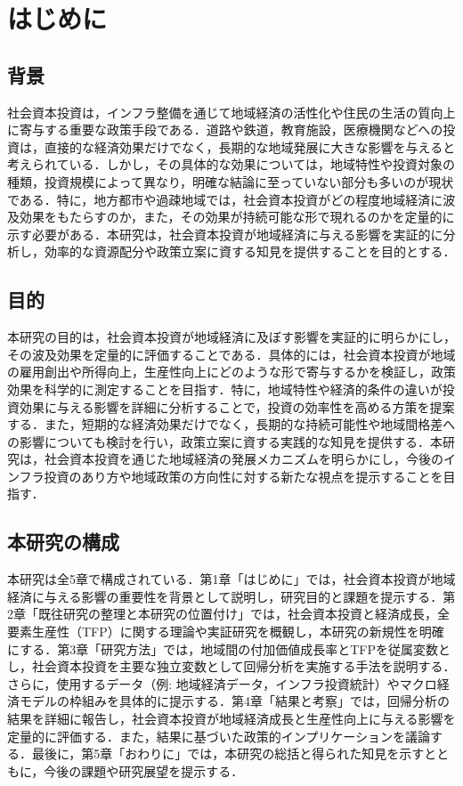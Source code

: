 \chapter{はじめに}

\section{背景}

社会資本投資は，インフラ整備を通じて地域経済の活性化や住民の生活の質向上に寄与する重要な政策手段である．道路や鉄道，教育施設，医療機関などへの投資は，直接的な経済効果だけでなく，長期的な地域発展に大きな影響を与えると考えられている．しかし，その具体的な効果については，地域特性や投資対象の種類，投資規模によって異なり，明確な結論に至っていない部分も多いのが現状である．特に，地方都市や過疎地域では，社会資本投資がどの程度地域経済に波及効果をもたらすのか，また，その効果が持続可能な形で現れるのかを定量的に示す必要がある．本研究は，社会資本投資が地域経済に与える影響を実証的に分析し，効率的な資源配分や政策立案に資する知見を提供することを目的とする．


\section{目的}

本研究の目的は，社会資本投資が地域経済に及ぼす影響を実証的に明らかにし，その波及効果を定量的に評価することである．具体的には，社会資本投資が地域の雇用創出や所得向上，生産性向上にどのような形で寄与するかを検証し，政策効果を科学的に測定することを目指す．特に，地域特性や経済的条件の違いが投資効果に与える影響を詳細に分析することで，投資の効率性を高める方策を提案する．また，短期的な経済効果だけでなく，長期的な持続可能性や地域間格差への影響についても検討を行い，政策立案に資する実践的な知見を提供する．本研究は，社会資本投資を通じた地域経済の発展メカニズムを明らかにし，今後のインフラ投資のあり方や地域政策の方向性に対する新たな視点を提示することを目指す．

\section{本研究の構成}

本研究は全5章で構成されている．第1章「はじめに」では，社会資本投資が地域経済に与える影響の重要性を背景として説明し，研究目的と課題を提示する．第2章「既往研究の整理と本研究の位置付け」では，社会資本投資と経済成長，全要素生産性（TFP）に関する理論や実証研究を概観し，本研究の新規性を明確にする．第3章「研究方法」では，地域間の付加価値成長率とTFPを従属変数とし，社会資本投資を主要な独立変数として回帰分析を実施する手法を説明する．さらに，使用するデータ（例: 地域経済データ，インフラ投資統計）やマクロ経済モデルの枠組みを具体的に提示する．第4章「結果と考察」では，回帰分析の結果を詳細に報告し，社会資本投資が地域経済成長と生産性向上に与える影響を定量的に評価する．また，結果に基づいた政策的インプリケーションを議論する．最後に，第5章「おわりに」では，本研究の総括と得られた知見を示すとともに，今後の課題や研究展望を提示する．

